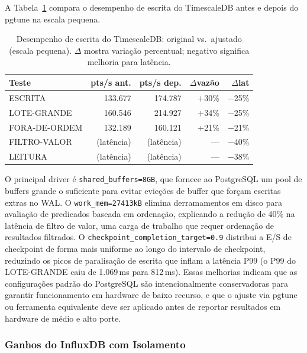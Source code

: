 A Tabela~\ref{tab:tsdb-tuning} compara o desempenho de escrita do TimescaleDB antes e depois
do pgtune na escala pequena.

\begin{table}[t]
  \centering
  \caption{Desempenho de escrita do TimescaleDB: original vs.\ ajustado (escala pequena).
  $\Delta$ mostra variação percentual; negativo significa melhoria para latência.}
  \label{tab:tsdb-tuning}
  \begin{tabular}{lrrrr}
    \hline
    \textbf{Teste} & \textbf{pts/s ant.} & \textbf{pts/s dep.} & $\Delta$vazão & $\Delta$lat \\
    \hline
    ESCRITA        & 133.677 & 174.787 & $+$30\% & $-$25\% \\
    LOTE-GRANDE    & 160.546 & 214.927 & $+$34\% & $-$25\% \\
    FORA-DE-ORDEM  & 132.189 & 160.121 & $+$21\% & $-$21\% \\
    FILTRO-VALOR   & (latência) & (latência) & ---     & $-$40\% \\
    LEITURA        & (latência) & (latência) & ---     & $-$38\% \\
    \hline
  \end{tabular}
\end{table}

O principal driver é \texttt{shared\_buffers=8GB}, que fornece ao PostgreSQL um pool de
buffers grande o suficiente para evitar evicções de buffer que forçam escritas extras no WAL.
O \texttt{work\_mem=27413kB} elimina derramamentos em disco para avaliação de predicados
baseada em ordenação, explicando a redução de 40\% na latência de filtro de valor, uma
carga de trabalho que requer ordenação de resultados filtrados. O
\texttt{checkpoint\_completion\_target=0.9} distribui a E/S de checkpoint de forma mais
uniforme ao longo do intervalo de checkpoint, reduzindo os picos de paralisação de escrita
que inflam a latência P99 (o P99 do LOTE-GRANDE caiu de 1.069\,ms para 812\,ms). Essas
melhorias indicam que as configurações padrão do PostgreSQL são intencionalmente conservadoras
para garantir funcionamento em hardware de baixo recurso, e que o ajuste via pgtune ou
ferramenta equivalente deve ser aplicado antes de reportar resultados em hardware de médio e
alto porte.

\subsubsection{Ganhos do InfluxDB com Isolamento}

